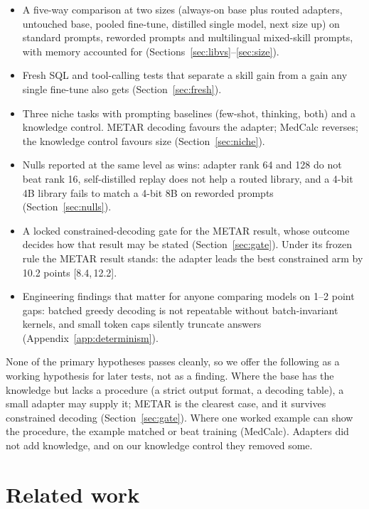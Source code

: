 \documentclass[11pt]{article}
\newcommand{\ci}[2]{[#1,\allowbreak\,#2]}
\begin{document}
\begin{itemize}
\item A five-way comparison at two sizes (always-on base plus routed adapters, untouched base, pooled fine-tune,
  distilled single model, next size up) on standard prompts, reworded prompts and multilingual mixed-skill prompts,
  with memory accounted for (Sections~\ref{sec:libvs}--\ref{sec:size}).
\item Fresh SQL and tool-calling tests that separate a skill gain from a gain any single fine-tune also gets
  (Section~\ref{sec:fresh}).
\item Three niche tasks with prompting baselines (few-shot, thinking, both) and a knowledge control. METAR decoding
  favours the adapter; MedCalc reverses; the knowledge control favours size (Section~\ref{sec:niche}).
\item Nulls reported at the same level as wins: adapter rank 64 and 128 do not beat rank 16, self-distilled replay
  does not help a routed library, and a 4-bit 4B library fails to match a 4-bit 8B on reworded prompts
  (Section~\ref{sec:nulls}).
\item A locked constrained-decoding gate for the METAR result, whose outcome decides how that result may be
  stated (Section~\ref{sec:gate}). Under its frozen rule the METAR result stands: the adapter leads the best
  constrained arm by 10.2 points \ci{8.4}{12.2}.
\item Engineering findings that matter for anyone comparing models on 1--2 point gaps: batched greedy decoding is
  not repeatable without batch-invariant kernels, and small token caps silently truncate answers
  (Appendix~\ref{app:determinism}).
\end{itemize}

None of the primary hypotheses passes cleanly, so we offer the following as a working hypothesis for later tests,
not as a finding. Where the base has the knowledge but lacks a procedure (a strict output format, a decoding table),
a small adapter may supply it; METAR is the clearest case, and it survives constrained decoding (Section~\ref{sec:gate}). Where one
worked example can show the procedure, the example matched or beat training (MedCalc). Adapters did not add
knowledge, and on our knowledge control they removed some.

\section{Related work}
\end{document}
